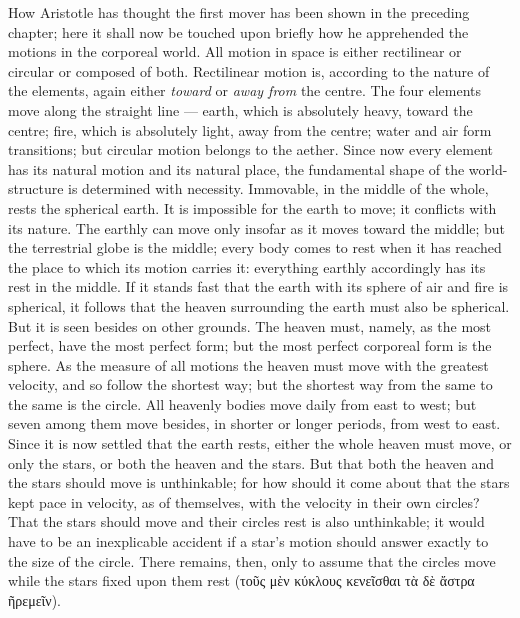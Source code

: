 \documentclass[12pt,a4paper]{book}
\begin{document}
How Aristotle has thought the first mover has been shown in the preceding chapter; here it shall now be
touched upon briefly how he apprehended the motions in the corporeal world. All motion in space is
either rectilinear or circular or composed of both. Rectilinear motion is, according to the nature of
the elements, again either \emph{toward} or \emph{away from} the centre.
The four elements move along the straight line --- earth, which is absolutely heavy, toward the centre;
fire, which is absolutely light, away from the centre; water and air form transitions; but circular
motion belongs to the aether. Since now every element has its natural motion and its natural place, the
fundamental shape of the world-structure is determined with necessity. Immovable, in the middle of the
whole, rests the spherical earth. It is impossible for the earth to move; it conflicts with its nature.
The earthly can move only insofar as it moves toward the middle; but the terrestrial globe is the
middle; every body comes to rest when it has reached the place to which its motion carries it:
everything earthly accordingly has its rest in the middle. If it stands fast that the earth with its
sphere of air and fire is spherical, it follows that the heaven surrounding the earth must also be
spherical.
But it is seen besides on other grounds. The heaven must, namely, as the most perfect, have the most
perfect form; but the most perfect corporeal form is the sphere. As the measure of all motions the
heaven must move with the greatest velocity, and so follow the shortest way; but the shortest way from
the same to the same is the circle. All heavenly bodies move daily from east to west; but seven among
them move besides, in shorter or longer periods, from west to east. Since it is now settled that the
earth rests, either the whole heaven must move, or only the stars, or both the heaven and the stars. But
that both the heaven and the stars should move is unthinkable; for how should it come about that the
stars kept pace in velocity, as of themselves, with the velocity in their own circles? That the stars
should move and their circles rest is also unthinkable; it would have to be an inexplicable accident if
a star's motion should answer exactly to the size of the circle. There remains, then, only to assume
that the circles move while the stars fixed upon them rest (τοῦς μὲν κύκλους κενεῖσθαι τὰ δὲ ἄστρα
ῆρεμεῖν).
\end{document}
